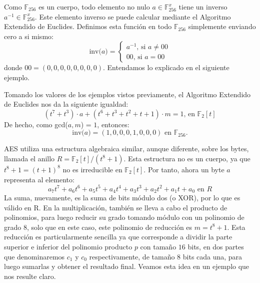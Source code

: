     Como $\mathbb{F}_{256}$ es un cuerpo, todo elemento no nulo $a \in \mathbb{F}^{x}_{256}$ tiene un inverso $a^{-1} \in \mathbb{F}^{x}_{256}$. Este elemento inverso se puede calcular mediante el Algoritmo Extendido de Euclides. Definimos esta función en todo $\mathbb{F}_{256}$ simplemente enviando cero a si mismo:
    \[
    \text{inv(}a\text{)} = 
    \left\{
        \begin{array}{l}
            a^{-1} \text{, si } a \neq 00 \\
            00 \text{, si } a = 00 
        \end{array}
    \right.
    \]
    donde $00 = (0, 0, 0, 0, 0, 0, 0, 0)$. Entendamos lo explicado en el siguiente ejemplo.
    \begin{ejemplo} \cite{cryptoSchool}
        Tomando los valores de los ejemplos vistos previamente, el Algoritmo Extendido de Euclides nos da la siguiente igualdad:
        \begin{equation}
            (t^{7} + t^{3}) \cdot a + (t^{6} + t^{3} + t^{2} + t + 1) \cdot m = 1 \text{, en } \mathbb{F}_{2}[t]
        \end{equation}
        De hecho, como gcd($a,m$) = $1$, entonces:
        \begin{equation}
            \text{inv(}a\text{)} = (1, 0, 0, 0, 1, 0, 0, 0) \text{ en } \mathbb{F}_{256}.
        \end{equation}
    \end{ejemplo}

    AES utiliza una estructura algebraica similar, aunque diferente, sobre los bytes, llamada el anillo $R =  \mathbb{F}_{2}[t]/(t^{8}+1)$. Esta estructura no es un cuerpo, ya que $t^{8}+1 = (t+1)^{8}$ no es irreducible en $\mathbb{F}_{2}[t]$. Por tanto, ahora un byte $a$ representa al elemento:
    \begin{equation}
        a_{7}t^{7} + a_{6}t^{6} + a_{5}t^{5} + a_{4}t^{4} + a_{3}t^{3} + a_{2}t^{2} + a_{1}t + a_{0} \text{ en } R
    \end{equation}
    La suma, nuevamente, es la suma de bits módulo dos (o XOR), por lo que es válido en R. En la multiplicación, también se lleva a cabo el producto de polinomios, para luego reducir su grado tomando módulo con un polinomio de grado $8$, solo que en este caso, este polinomio de reducción es $m = t^{8}+1$. Esta reducción es particularmente sencilla ya que corresponde a dividir la parte superior e inferior del polinomio producto $p$ con tamaño $16$ bits, en dos partes que denominaremos $c_{1}$ y $c_{0}$ respectivamente, de tamaño $8$ bits cada una, para luego sumarlas y obtener el resultado final. Veamos esta idea en un ejemplo que nos resulte claro.

